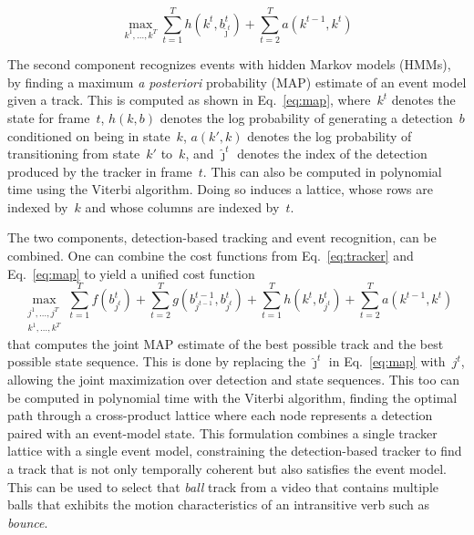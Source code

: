 \begin{figure}
  \vspace*{-6.5ex}
  \begin{center}
    \begin{minipage}[b]{0.45\textwidth}
      \begin{equation}
        \max_{k^1,\ldots,k^T}
        \sum_{t=1}^Th(k^t,b^t_{\hat{\jmath}^t})+\sum_{t=2}^Ta(k^{t-1},k^t)
        \label{eq:map}
      \end{equation}
    \end{minipage}
  \end{center}
  \vspace*{-3ex}
\end{figure}
%
The second component recognizes events with hidden Markov models (HMMs), by
finding a maximum \emph{a posteriori} probability (MAP) estimate of an event
model given a track.
%
This is computed as shown in Eq.~\ref{eq:map}, where~$k^t$ denotes the
state for frame~$t$, $h(k,b)$ denotes the log probability of generating a
detection~$b$ conditioned on being in state~$k$, $a(k',k)$ denotes the log
probability of transitioning from state~$k'$ to~$k$, and $\hat{\jmath}^t$
denotes the index of the detection produced by the tracker in frame~$t$.
%
This can also be computed in polynomial time using the Viterbi algorithm.
%
Doing so induces a lattice, whose rows are indexed by~$k$ and whose columns are
indexed by~$t$.

The two components, detection-based tracking and event recognition, can be
combined.
One can combine the cost functions from Eq.~\ref{eq:tracker} and
Eq.~\ref{eq:map} to yield a unified cost function
%
\begin{equation*}
  \max_{\substack{j^1,\ldots,j^T\\k^1,\ldots,k^T}}
  \displaystyle\sum_{t=1}^T f(b^t_{j^t})
  +\displaystyle\sum_{t=2}^T g(b^{t-1}_{j^{t-1}},b^t_{j^t})
  +\displaystyle\sum_{t=1}^Th(k^t,b^t_{j^t})
  +\displaystyle\sum_{t=2}^Ta(k^{t-1},k^t)
\end{equation*}
%
that computes the joint MAP estimate of the best possible track and the best
possible state sequence.
%
This is done by replacing the $\hat{\jmath}^t$ in Eq.~\ref{eq:map} with~$j^t$,
allowing the joint maximization over detection and state sequences.
%
This too can be computed in polynomial time with the Viterbi algorithm, finding
the optimal path through a cross-product lattice where each node represents a
detection paired with an event-model state.
%
This formulation combines a single tracker lattice with a single event model,
constraining the detection-based tracker to find a track that is not only
temporally coherent but also satisfies the event model.
%
This can be used to select that \emph{ball} track from a video that contains
multiple balls that exhibits the motion characteristics of an intransitive verb
such as \emph{bounce}.

